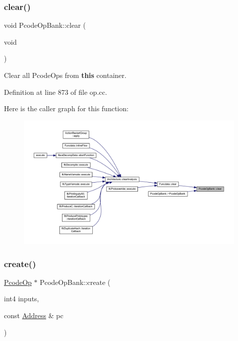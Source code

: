 \subsubsection{\texorpdfstring{clear()}{clear()}}
{\footnotesize\ttfamily void Pcode\+Op\+Bank\+::clear (\begin{DoxyParamCaption}\item[{void}]{ }\end{DoxyParamCaption})}



Clear all Pcode\+Ops from {\bfseries{this}} container. 



Definition at line 873 of file op.\+cc.

Here is the caller graph for this function\+:
\nopagebreak
\begin{figure}[H]
\begin{center}
\leavevmode
\includegraphics[width=350pt]{class_pcode_op_bank_a75aac7c9c8c0c73002fbd6352e41f67b_icgraph}
\end{center}
\end{figure}
\mbox{\label{class_pcode_op_bank_a99a5d552174bddb89036c1755708b9aa}} 
\subsubsection{\texorpdfstring{create()}{create()}\hspace{0.1cm}{\footnotesize\ttfamily [1/2]}}
{\footnotesize\ttfamily \mbox{\hyperlink{class_pcode_op}{Pcode\+Op}} $\ast$ Pcode\+Op\+Bank\+::create (\begin{DoxyParamCaption}\item[{int4}]{inputs,  }\item[{const \mbox{\hyperlink{class_address}{Address}} \&}]{pc }\end{DoxyParamCaption})}



